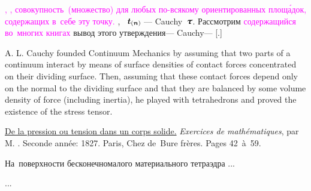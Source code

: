 \begin{otherlanguage}{russian}
\textcolor{magenta}{, ,  совокупность~(множество)  для любых по\hbox{-}всякому ориентированных площ\'{а}док, содержащих в~себе эту точку.}
,  ~$\tractionvector{\currentunitnormal}$   \:--- Cauchy~$\cauchystress$.
Рассмотрим \textcolor{magenta}{содержащийся во~многих книгах} вывод этого утверждения\:---    Cauchy\:---  [.]

{\small
A. L. Cauchy founded Continuum Mechanics by assuming that two parts of a continuum interact by means of surface densities of contact forces concentrated on their dividing surface.
Then, assuming that these contact forces depend only on the normal to the dividing surface and that they are balanced by some volume density of force (including inertia), he played with tetrahedrons and proved the existence of the stress tensor.
\par}

\noindent
\href{https://play.google.com/books/reader?id=w-741ZwVBnAC&pg=GBS.PA42}{De la pression ou tension dans un corps solide.} \emph{Exercices de ma\-th\'{e}\-ma\-tiques}, par M.\hspace{-0.2ex} \href{https://en.wikipedia.org/wiki/Augustin-Louis_Cauchy}{}. Seconde ann\'{e}e: 1827. Paris, Chez de~Bure fr\`{e}res. Pages 42~à~59.


На~поверхности бесконечномалого материального тетраэдра ...


...


\end{otherlanguage}

